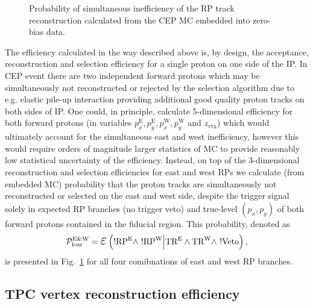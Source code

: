 \begin{figure}[ht!]
\begin{minipage}{.4725\textwidth}
  \caption{Probability of simultaneous inefficiency of the RP track reconstruction calculated from the CEP MC embedded into zero-bias data.\newline\newline\newline\newline\newline}\label{fig:SimultaneousEastWestRpTrackLoss}
\end{minipage}%
\end{figure}%


The efficiency calculated in the way described above is, by design, the acceptance, reconstruction and selection efficiency for a single proton on one side of the IP. In CEP event there are two independent forward protons which may be simultaneously not reconstructed or rejected by the selection algorithm due to e.g. elastic pile-up interaction providing additional good quality proton tracks on both sides of IP. One could, in principle, calculate 5-dimensional efficiency for both forward protons (in variables $p_{x}^{\text{E}}, p_{y}^{\text{E}}, p_{x}^{\text{W}}, p_{y}^{\text{W}}$ and $z_{\text{vtx}}$) which would ultimately account for the simultaneous east and west inefficiency, however this would require orders of magnitude larger statistics of MC to provide reasonably low statistical uncertainty of the efficiency. Instead, on top of the 3-dimensional reconstruction and selection efficiencies for east and west RPs we calculate (from embedded MC) probability that the proton tracks are simultaneously not reconstructed or selected on the east and west side, despite the trigger signal solely in expected RP branches (no trigger veto) and true-level $(p_{x}, p_{y})$ of both forward protons contained in the fiducial region. This probability, denoted as
\begin{equation}
\mathcal{P}^{\text{E\&W}}_{\text{loss}} = \mbox{\LARGE$\varepsilon$}\left(!\RPE\land~!\RPW\Big|\TRE\land\TRW\land~!\V\Big.\right),
\end{equation}
 is presented in Fig.~\ref{fig:SimultaneousEastWestRpTrackLoss} for all four comibnations of east and west RP branches.





\subsection{TPC vertex reconstruction efficiency}\label{sec:tpcVxRecoEff}

